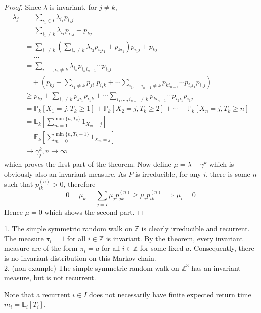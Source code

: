 \begin{proof}
    Since $\lambda$ is invariant, for $j\neq k$,
    \begin{align*}
        \lambda_j&=\sum_{i_1\in I}\lambda_{i_1}p_{i_1j}\\
        &=\sum_{i_1\neq k}\lambda_{i_1}p_{i_1j}+p_{kj}\\
        &=\sum_{i_1\neq k}\left( \sum_{i_2\neq k}\lambda_{i_2}p_{i_2i_1}+p_{ki_1} \right)p_{i_1j} +p_{kj}\\
        &=\cdots\\
        &=\sum_{i_1,\ldots,i_n\neq k}\lambda_{i_n}p_{i_ni_{n-1}}\cdots p_{i_1j}\\
        &\quad+\left( p_{kj}+\sum_{i_1\neq k}p_{ji_1}p_{i_1k}+\cdots\sum_{i_1,\ldots,i_{n-1}\neq k}p_{ki_{n-1}}\cdots p_{i_2i_1}p_{i_1j} \right)\\
        &\ge p_{kj}+\sum_{i_1\neq k}p_{ji_1}p_{i_1k}+\cdots\sum_{i_1,\ldots,i_{n-1}\neq k}p_{ki_{n-1}}\cdots p_{i_2i_1}p_{i_1j}\\
        &=\mathbb P_k[X_1=j,T_k\ge 1]+\mathbb P_k[X_2=j,T_k\ge 2]+\cdots+\mathbb P_k[X_n=j,T_k\ge n]\\
        &=\mathbb E_k\left[ \sum_{m=1}^{\min\{n,T_k\}}1_{X_m=j} \right]\\
        &=\mathbb E_k\left[ \sum_{m=0}^{\min\{n,T_k-1\}}1_{X_m=j} \right]\\
        &\to \gamma_j^k,n\to\infty
    \end{align*}
    which proves the first part of the theorem.
    Now define $\mu=\lambda-\gamma^k$ which is obviously also an invariant measure.
    As $P$ is irreducible, for any $i$, there is some $n$ such that $p_{ik}^{(n)}>0$, therefore
    $$0=\mu_k=\sum_{j=I}\mu_jp_{jk}^{(n)}\ge\mu_ip_{ik}^{(n)}\implies \mu_i=0$$
    Hence $\mu=0$ which shows the second part.
\end{proof}
\begin{example}
    1. The simple symmetric random walk on $\mathbb Z$ is clearly irreducible and recurrent.
    The measure $\pi_i=1$ for all $i\in\mathbb Z$ is invariant.
    By the theorem, every invariant measure are of the form $\pi_i=a$ for all $i\in\mathbb Z$ for some fixed $a$.
    Consequently, there is no invariant distribution on this Markov chain.\\
    2. (non-example) The simple symmetric random walk on $\mathbb Z^3$ has an invariant measure, but is not recurrent.
\end{example}
Note that a recurrent $i\in I$ does not necessarily have finite expected return time $m_i=\mathbb E_i[T_i]$.
